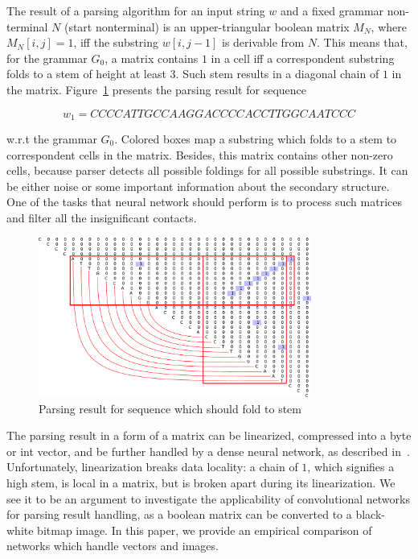 \documentclass[runningheads]{llncs}
\begin{document}
The result of a parsing algorithm for an input string $w$ and a fixed grammar non-terminal $N$ (start nonterminal) is an upper-triangular boolean matrix $M_N$, where $M_N [i,j] = 1$, iff the substring $w[i,j-1]$ is derivable from $N$.
This means that, for the grammar $G_0$, a matrix contains $1$ in a cell iff a correspondent substring folds to a  stem of height at least 3.
Such stem results in a diagonal chain of $1$ in the matrix.
Figure~\ref{fig:example} presents the parsing result for sequence

\[
w_1 = CCCCATTGCCAAGGACCCCACCTTGGCAATCCC
\]

w.r.t the grammar $G_0$.
Colored boxes map a substring which folds to a stem to correspondent cells in the matrix. Besides, this matrix contains other non-zero cells, because parser detects all possible foldings for all possible substrings. It can be either noise or some important information about the secondary structure. One of the tasks that neural network should perform is to process such matrices and filter all the insignificant contacts.

\begin{figure}[h]
\begin{center}
\centering
\includegraphics[width=0.8\textwidth]{figures/4.pdf}
\caption{Parsing result for sequence which should fold to
stem}
\label{fig:example}
\end{center}
\end{figure}

The parsing result in a form of a matrix can be linearized, compressed into a byte or int vector, and be further handled by a dense neural network, as described in~\cite{grigorevcomposition}.
Unfortunately, linearization breaks data locality: a chain of $1$, which signifies a high stem, is local in a matrix, but is broken apart during its linearization.
We see it to be an argument to investigate the applicability of convolutional networks for parsing result handling, as a boolean matrix can be converted to a black-white bitmap image.
In this paper, we provide an empirical comparison of networks which handle vectors and images.
\end{document}
